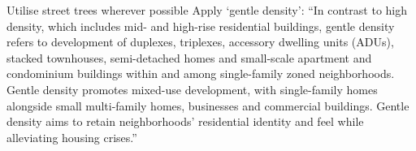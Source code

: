 Utilise street trees wherever possible
Apply ‘gentle density’: “In contrast to high density, which includes mid- and high-rise residential buildings, gentle density refers to development of duplexes, triplexes, accessory dwelling units (ADUs), stacked townhouses, semi-detached homes and small-scale apartment and condominium buildings within and among single-family zoned neighborhoods. Gentle density promotes mixed-use development, with single-family homes alongside small multi-family homes, businesses and commercial buildings. Gentle density aims to retain neighborhoods’ residential identity and feel while alleviating housing crises.”